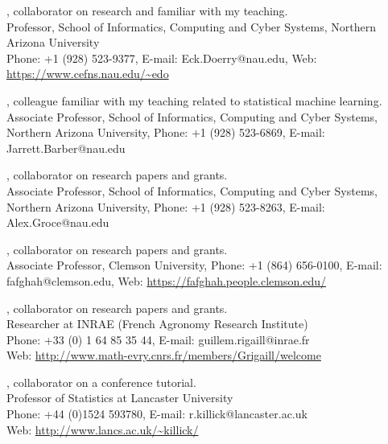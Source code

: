 \documentclass[margin,line]{res}
\begin{document}
\begin{resume}
, collaborator on research and familiar with my teaching.\\
Professor, School of Informatics, Computing and Cyber Systems, Northern Arizona University\\
Phone: +1 (928) 523-9377, E-mail: Eck.Doerry@nau.edu, Web: \url{https://www.cefns.nau.edu/~edo}

, colleague familiar with my teaching related to statistical machine learning.\\
Associate Professor, School of Informatics, Computing and Cyber Systems,\\
Northern Arizona University, 
Phone: +1 (928) 523-6869, E-mail: Jarrett.Barber@nau.edu

, collaborator on research papers and grants.\\
Associate Professor, School of Informatics, Computing and Cyber Systems,\\
Northern Arizona University, 
Phone: +1 (928) 523-8263, E-mail: Alex.Groce@nau.edu

, collaborator on research papers and grants.\\
Associate Professor, Clemson University, Phone: +1 (864) 656-0100, E-mail: fafghah@clemson.edu, Web: \url{https://fafghah.people.clemson.edu/}

, collaborator on research papers and grants.\\
Researcher at INRAE (French Agronomy Research Institute)\\
Phone: +33 (0) 1 64 85 35 44, E-mail: guillem.rigaill@inrae.fr\\
Web: \url{http://www.math-evry.cnrs.fr/members/Grigaill/welcome}

, collaborator on a conference tutorial.\\
Professor of Statistics at Lancaster University\\
Phone: +44 (0)1524 593780, E-mail: r.killick@lancaster.ac.uk\\
Web: \url{http://www.lancs.ac.uk/~killick/}

\end{resume}
\end{document}
